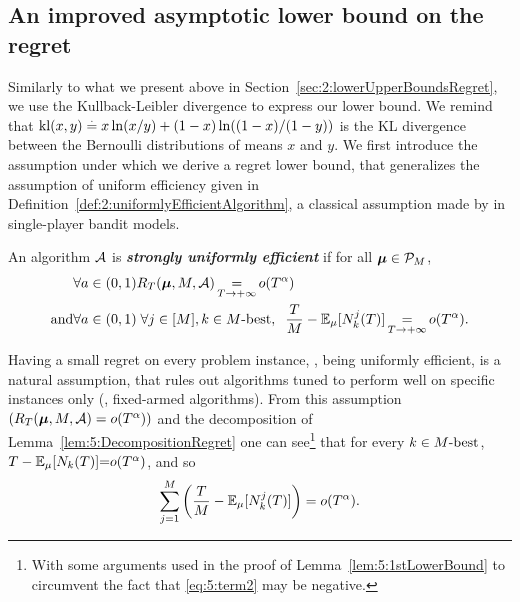 \subsection{An improved asymptotic lower bound on the regret}
\label{sub:5:betterLowerBound}

Similarly to what we present above in Section~\ref{sec:2:lowerUpperBoundsRegret},
we use the Kullback-Leibler divergence to express our lower bound.
We remind that $\mathrm{kl}(x,y) \overset{.}{=} x\ln(x/y) + (1-x)\ln((1-x)/(1-y))$ is the KL divergence between the Bernoulli distributions of means $x$ and $y$.
%
We first introduce the assumption under which we derive a regret lower bound, that generalizes the assumption of uniform efficiency given in Definition~\ref{def:2:uniformlyEfficientAlgorithm},
a classical assumption made by \cite{LaiRobbins85} in single-player bandit models.
%
\vspace*{-20pt}  %
\begin{definition}\label{def:5:DecentralizedUniformEfficiency}
\begin{leftbar}[defnbar]  %
  An algorithm $\mathcal{A}$  is \emph{\textbf{strongly uniformly efficient}} if for all $\boldsymbol{\mu} \in \mathcal{P}_M$,
  \begin{align}
    \forall a\in(0,1) & R_T(\boldsymbol{\mu},M,\mathcal{A}) \mathop{=}\limits_{T \to +\infty} o(T^\alpha) \\
    \text{and} \forall a\in(0,1) & \;
    \forall j \in [M], k \in M\text{-}\mathrm{best}, \;\;
    \frac{T}{M}
    - \mathbb{E}_{\mu}[N_k^j(T)] \mathop{=}\limits_{T \to +\infty} o(T^{\alpha}).
    \label{eq:5:SUE}
  \end{align}
\end{leftbar}  %
\end{definition}


Having a small regret on every problem instance, \ie, being uniformly efficient,
is a natural assumption,
that rules out algorithms tuned to perform well on specific instances only (\eg, fixed-armed algorithms).
%
From this assumption $\left(R_T(\boldsymbol{\mu},M,\mathcal{A})=o(T^\alpha)\right)$ and the decomposition of Lemma~\ref{lem:5:DecompositionRegret} one can see\footnote{With some arguments used in the proof of Lemma~\ref{lem:5:1stLowerBound} to circumvent the fact that \ref{eq:5:term2} may be negative.} that for every $k \in M\text{-}\mathrm{best}$,
${T}- \mathbb{E}_{\mu}[N_k(T)] {=} o(T^{\alpha})$, and so
\begin{equation}\label{eq:5:intermediate}
  \sum_{j =1}^M\left(\frac{T}{M} - \mathbb{E}_{\mu}[N_k^j(T)]\right) = o(T^{\alpha}).
\end{equation}

